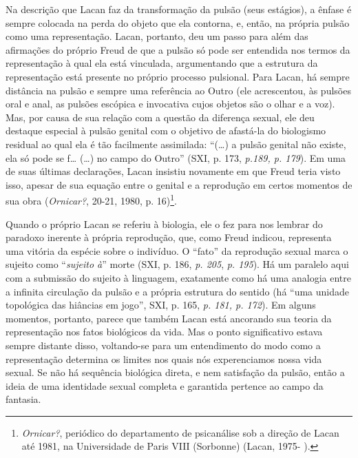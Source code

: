 Na descrição que Lacan faz da transformação da pulsão (seus estágios), a
ênfase é sempre colocada na perda do objeto que ela contorna, e, então,
na própria pulsão como uma representação. Lacan, portanto, deu um passo
para além das afirmações do próprio Freud de que a pulsão só pode ser
entendida nos termos da representação à qual ela está vinculada,
argumentando que a estrutura da representação está presente no próprio
processo pulsional. Para Lacan, há sempre distância na pulsão e sempre
uma referência ao Outro (ele acrescentou, às pulsões oral e anal, as
pulsões escópica e invocativa cujos objetos são o olhar e a voz). Mas,
por causa de sua relação com a questão da diferença sexual, ele deu
destaque especial à pulsão genital com o objetivo de afastá-la do
biologismo residual ao qual ela é tão facilmente assimilada: ``(\ldots{}) a
pulsão genital não existe, ela só pode se f\ldots{} (\ldots{}) no campo do Outro''
(SXI, p. 173, \emph{p.189, p. 179}). Em uma de suas últimas declarações,
Lacan insistiu novamente em que Freud teria visto isso, apesar de sua
equação entre o genital e a reprodução em certos momentos de sua obra
(\emph{Ornicar?}, 20-21, 1980, p. 16)\footnote{\emph{Ornicar?},
  periódico do departamento de psicanálise sob a direção de Lacan até
  1981, na Universidade de Paris VIII (Sorbonne) (Lacan, 1975- ).}.

Quando o próprio Lacan se referiu à biologia, ele o fez para nos lembrar
do paradoxo inerente à própria reprodução, que, como Freud indicou,
representa uma vitória da espécie sobre o indivíduo. O ``fato'' da
reprodução sexual marca o sujeito como ``\emph{sujeito à}'' morte (SXI,
p. 186, \emph{p. 205}, \emph{p. 195}). Há um paralelo aqui com a
submissão do sujeito à linguagem, exatamente como há uma analogia entre
a infinita circulação da pulsão e a própria estrutura do sentido (há
``uma unidade topológica das hiâncias em jogo'', SXI, p. 165, \emph{p.
181, p. 172}). Em alguns momentos, portanto, parece que também Lacan
está ancorando sua teoria da representação nos fatos biológicos da vida.
Mas o ponto significativo estava sempre distante disso, voltando-se para
um entendimento do modo como a representação determina os limites nos
quais nós experenciamos nossa vida sexual. Se não há sequência biológica
direta, e nem satisfação da pulsão, então a ideia de uma identidade
sexual completa e garantida pertence ao campo da fantasia.

